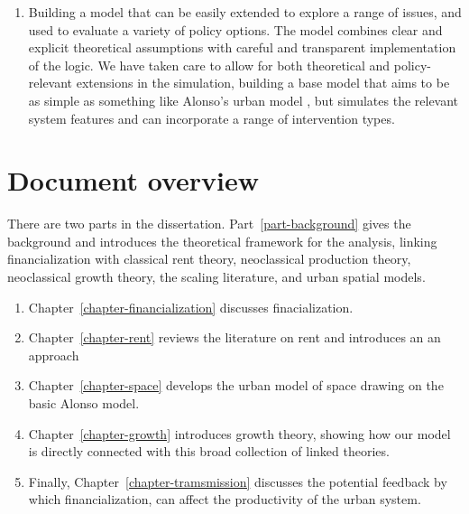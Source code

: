 \begin{enumerate}

    \item Building a model that can be easily extended to explore a range of issues, and used to evaluate a variety of policy options. The model combines clear and explicit theoretical assumptions with careful and transparent implementation of the logic. We have taken care to allow for both theoretical and policy-relevant extensions in the simulation,  building a base model that aims to be as simple as something like Alonso's urban model \cite{alonsoLocationLandUse1964}, but simulates the relevant system features and can incorporate a range of intervention types. 
\end{enumerate}


\section{Document overview}
There are two parts in the dissertation. Part~\ref{part-background} gives the background and introduces the theoretical framework for the analysis, linking financialization with classical rent theory, neoclassical production theory, neoclassical growth theory, the scaling literature, and urban spatial models. 

\begin{enumerate}
    \item Chapter~\ref{chapter-financialization} discusses finacialization.

    \item Chapter~\ref{chapter-rent} reviews the literature on rent and introduces an an approach %

    \item Chapter~\ref{chapter-space} develops the urban model of space drawing on the basic Alonso model.

    \item Chapter~\ref{chapter-growth} introduces growth theory, showing how our model is directly connected with this broad collection of linked theories. 

    \item Finally, Chapter~\ref{chapter-tramsmission} discusses the potential feedback by which financialization, can affect the productivity of the urban system. %
\end{enumerate}
 
